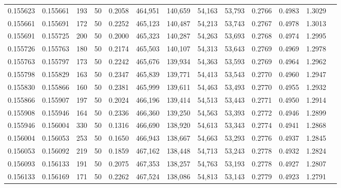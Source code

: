 \begin{tabular}{rrrrrrrrrrrrr}
0.155623 & 0.155661 &   193 &  50 &                                     0.2058 & 464,951 & 140,659 &  54,163 &  53,793 & 0.2766 & 0.4983 & 1.3029 \\
0.155661 & 0.155691 &   172 &  50 &                                     0.2252 & 465,123 & 140,487 &  54,213 &  53,743 & 0.2767 & 0.4978 & 1.3013 \\
0.155691 & 0.155725 &   200 &  50 &                                     0.2000 & 465,323 & 140,287 &  54,263 &  53,693 & 0.2768 & 0.4974 & 1.2995 \\
0.155726 & 0.155763 &   180 &  50 &                                     0.2174 & 465,503 & 140,107 &  54,313 &  53,643 & 0.2769 & 0.4969 & 1.2978 \\
0.155763 & 0.155797 &   173 &  50 &                                     0.2242 & 465,676 & 139,934 &  54,363 &  53,593 & 0.2769 & 0.4964 & 1.2962 \\
0.155798 & 0.155829 &   163 &  50 &                                     0.2347 & 465,839 & 139,771 &  54,413 &  53,543 & 0.2770 & 0.4960 & 1.2947 \\
0.155830 & 0.155866 &   160 &  50 &                                     0.2381 & 465,999 & 139,611 &  54,463 &  53,493 & 0.2770 & 0.4955 & 1.2932 \\
0.155866 & 0.155907 &   197 &  50 &                                     0.2024 & 466,196 & 139,414 &  54,513 &  53,443 & 0.2771 & 0.4950 & 1.2914 \\
0.155908 & 0.155946 &   164 &  50 &                                     0.2336 & 466,360 & 139,250 &  54,563 &  53,393 & 0.2772 & 0.4946 & 1.2899 \\
0.155946 & 0.156004 &   330 &  50 &                                     0.1316 & 466,690 & 138,920 &  54,613 &  53,343 & 0.2774 & 0.4941 & 1.2868 \\
0.156004 & 0.156053 &   253 &  50 &                                     0.1650 & 466,943 & 138,667 &  54,663 &  53,293 & 0.2776 & 0.4937 & 1.2845 \\
0.156053 & 0.156092 &   219 &  50 &                                     0.1859 & 467,162 & 138,448 &  54,713 &  53,243 & 0.2778 & 0.4932 & 1.2824 \\
0.156093 & 0.156133 &   191 &  50 &                                     0.2075 & 467,353 & 138,257 &  54,763 &  53,193 & 0.2778 & 0.4927 & 1.2807 \\
0.156133 & 0.156169 &   171 &  50 &                                     0.2262 & 467,524 & 138,086 &  54,813 &  53,143 & 0.2779 & 0.4923 & 1.2791 \\

\end{tabular}
